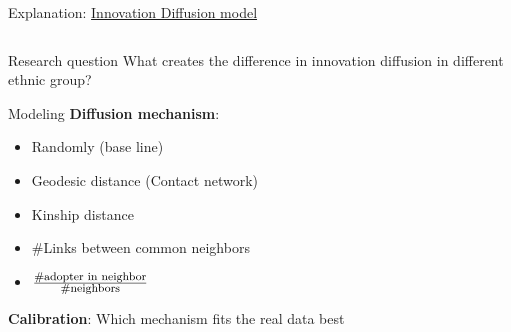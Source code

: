 \documentclass[compress]{beamer}
\begin{document}
\begin{frame}{Explanation: \href{https://github.com/CinkerZX/circles-and-squares}{Innovation Diffusion model\cite{manzo2018complex}}}
\begin{columns}[c]
\begin{column}{.5\textwidth}
\begin{minipage}{5.8cm}
                \begin{block}{Research question}
                    What creates the difference in innovation diffusion in different ethnic group?
                \end{block}
                \begin{block}{Modeling}
                    \textbf{Diffusion mechanism}:\\
                    \begin{itemize}
                        \item Randomly (base line)
                        \item Geodesic distance (Contact network)
                        \item Kinship distance
                        \item \#Links between common neighbors
                        \item $\frac{\text{\footnotesize \#adopter in neighbor}}{\text{\footnotesize \#neighbors}}$
                    \end{itemize}
                    \textbf{Calibration}: Which mechanism fits the real data best
                \end{block}
            \end{minipage}
        \end{column}
    \end{columns}
\end{frame}
\end{document}
